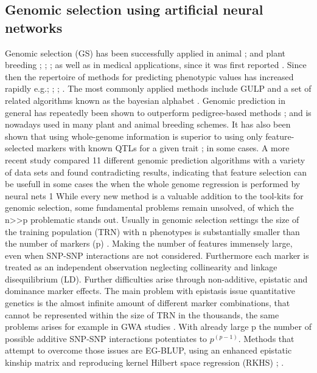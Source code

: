 \subsection{Genomic selection using artificial neural networks }
Genomic selection (GS) has been successfully applied in animal \cite{gianola2015one}; \cite{hayes2010genome}
and plant breeding \cite{crossa2010}; \cite{desta2014genomic}; \cite{heffner2010plant};
\cite{crossa2017genomic} as well as in medical applications, since it was first reported
\cite{hayes2001}. Since then the repertoire of methods for predicting phenotypic values has increased rapidly
e.g.\cite{dlc2009}; \cite{habier2011}; \cite{gianola2013} ; \cite{crossa2017}. The most commonly applied
methods include GULP and a set of related algorithms known as the bayesian alphabet
\cite{gianola2009}. Genomic prediction in general has repeatedly been shown to outperform pedigree-based
methods \cite{crossa2010}; \cite{albrecht2011} and is nowadays used in many plant and animal breeding
schemes. It has also been shown that using whole-genome information is superior to using only feature-selected
markers with known QTLs for a given trait \cite{bernardo2007}; \cite{heffner2011} in some cases. A more recent
study \cite{azodi2019} compared 11 different genomic prediction algorithms with a variety of data sets and
found contradicting results, indicating that feature selection can be usefull in some cases the when the whole
genome regression is performed by neural nets 1 While every new method is a valuable addition to the tool-kits
for genomic selection, some fundamental problems remain unsolved, of which the n>>p problematic stands
out. Usually in genomic selection settings the size of the training population (TRN) with n phenotypes is
substantially smaller than the number of markers (p) \cite{fan2014challenges}. Making the number of features
immensely large, even when SNP-SNP interactions are not considered. Furthermore each marker is treated as an
independent observation neglecting collinearity and linkage disequilibrium (LD). Further difficulties arise
through non-additive, epistatic and dominance marker effects. The main problem with epistasis issue
quantitative genetics is the almost infinite amount of different marker combinations, that cannot be
represented within the size of TRN in the thousands, the same problems arises for example in GWA studies
\cite{korte2013advantages}. With already large p the number of possible additive SNP-SNP interactions
potentiates to $p^{(p-1)}$. Methods that attempt to overcome those issues are EG-BLUP, using an enhanced
epistatic kinship matrix and reproducing kernel Hilbert space regression (RKHS) \cite{jiang2015};
\cite{martini2017genomic}.

